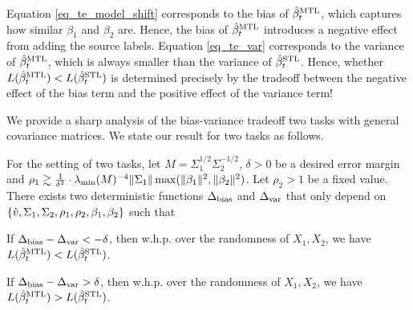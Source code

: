 Equation \eqref{eq_te_model_shift} corresponds to the bias of $\hat{\beta}_t^{\text{MTL}}$, which captures how similar $\beta_1$ and $\beta_2$ are.
Hence, the bias of $\hat{\beta}_t^{\text{MTL}}$ introduces a negative effect from adding the source labels.
Equation \eqref{eq_te_var} corresponds to the variance of $\hat{\beta}_t^{\text{MTL}}$, which is always smaller than the variance of $\hat{\beta}_t^{\text{STL}}$.
Hence, whether $L(\hat{\beta}_t^{\text{MTL}}) < L(\hat{\beta}_t^{\text{STL}})$ is determined precisely by the tradeoff between the negative effect of the bias term and the positive effect of the variance term!






We provide a sharp analysis of the bias-variance tradeoff two tasks with general covariance matrices.
We state our result for two tasks as follows.
\begin{corollary}\label{thm_main_informal}
	For the setting of two tasks, let $M=\Sigma_1^{1/2}\Sigma_2^{-1/2}$, $\delta > 0$ be a desired error margin and $\rho_1 \gtrsim \frac{1}{\delta^2}\cdot \lambda_{\min}(M)^{-4} \|\Sigma_1\| \max(\|\beta_1\|^2, \|\beta_2\|^2)$.
	Let $\rho_2 > 1$ be a fixed value.
 	There exists two deterministic functions $\Delta_{\text{bias}}$ and $\Delta_{\text{var}}$ that only depend on $\{\hat{v}, \Sigma_1, \Sigma_2, \rho_1, \rho_2, \beta_1, \beta_2\}$ such that
	\squishlist
		\item If $\Delta_{\text{bias}} - \Delta_{\text{var}} < -\delta$, then w.h.p. over the randomness of $X_1, X_2$, we have $L(\hat{\beta}_t^{\text{MTL}}) < L(\hat{\beta}_t^{\text{STL}})$.
		\item If $\Delta_{\text{bias}} - \Delta_{\text{var}} > \delta$, then w.h.p. over the randomness of $X_1, X_2$, we have $L(\hat{\beta}_t^{\text{MTL}}) > L(\hat{\beta}_t^{\text{STL}})$.
	\squishend
\end{corollary}

